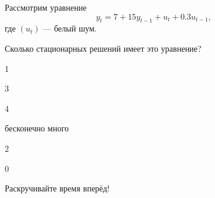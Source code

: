 
\begin{question}
Рассмотрим уравнение
\[
y_t = 7 + 15 y_{t-1} +  u_t + 0.3 u_{t-1},
\]
где \((u_t)\) --- белый шум.

Сколько стационарных решений имеет это уравнение?
\begin{answerlist}
  \item 1
  \item 3
  \item 4
  \item бесконечно много
  \item 2
  \item 0
\end{answerlist}
\end{question}

\begin{solution}
Раскручивайте время вперёд!
\end{solution}

